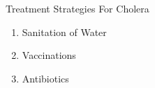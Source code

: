 \documentclass{beamer}\usepackage[]{graphicx}\usepackage[]{color}
\begin{document}
% 
% 
% 
% 
% 
% 
% 


\begin{frame}{Treatment Strategies For Cholera}
\begin{enumerate}
\setlength\itemsep{2em}
\item Sanitation of Water
\item Vaccinations
\item Antibiotics
\end{enumerate}
\end{frame}
\end{document}
